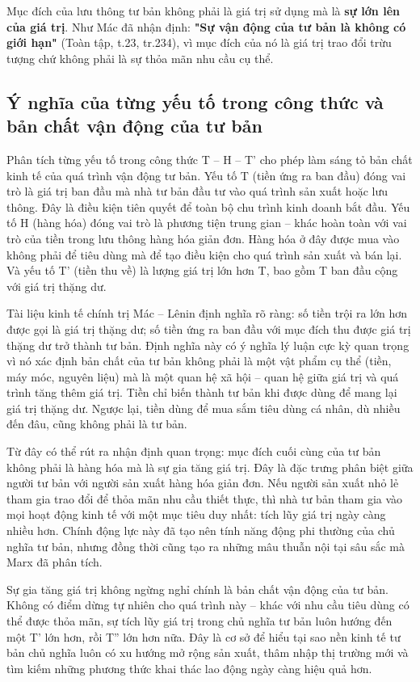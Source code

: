 Mục đích của lưu thông tư bản không phải là giá trị sử dụng mà là \textbf{sự lớn lên của giá trị}. Như Mác đã nhận định: \textbf{"Sự vận động của tư bản là không có giới hạn"} (Toàn tập, t.23, tr.234), vì mục đích của nó là giá trị trao đổi trừu tượng chứ không phải là sự thỏa mãn nhu cầu cụ thể.

\subsection{Ý nghĩa của từng yếu tố trong công thức và bản chất vận động của tư bản}
Phân tích từng yếu tố trong công thức T – H – T' cho phép làm sáng tỏ bản chất kinh tế của quá trình vận động tư bản. Yếu tố T (tiền ứng ra ban đầu) đóng vai trò là giá trị ban đầu mà nhà tư bản đầu tư vào quá trình sản xuất hoặc lưu thông. Đây là điều kiện tiên quyết để toàn bộ chu trình kinh doanh bắt đầu. Yếu tố H (hàng hóa) đóng vai trò là phương tiện trung gian – khác hoàn toàn với vai trò của tiền trong lưu thông hàng hóa giản đơn. Hàng hóa ở đây được mua vào không phải để tiêu dùng mà để tạo điều kiện cho quá trình sản xuất và bán lại. Và yếu tố T' (tiền thu về) là lượng giá trị lớn hơn T, bao gồm T ban đầu cộng với giá trị thặng dư.

Tài liệu kinh tế chính trị Mác – Lênin định nghĩa rõ ràng: số tiền trội ra lớn hơn được gọi là giá trị thặng dư; số tiền ứng ra ban đầu với mục đích thu được giá trị thặng dư trở thành tư bản. Định nghĩa này có ý nghĩa lý luận cực kỳ quan trọng vì nó xác định bản chất của tư bản không phải là một vật phẩm cụ thể (tiền, máy móc, nguyên liệu) mà là một quan hệ xã hội – quan hệ giữa giá trị và quá trình tăng thêm giá trị. Tiền chỉ biến thành tư bản khi được dùng để mang lại giá trị thặng dư. Ngược lại, tiền dùng để mua sắm tiêu dùng cá nhân, dù nhiều đến đâu, cũng không phải là tư bản.

Từ đây có thể rút ra nhận định quan trọng: mục đích cuối cùng của tư bản không phải là hàng hóa mà là sự gia tăng giá trị. Đây là đặc trưng phân biệt giữa người tư bản với người sản xuất hàng hóa giản đơn. Nếu người sản xuất nhỏ lẻ tham gia trao đổi để thỏa mãn nhu cầu thiết thực, thì nhà tư bản tham gia vào mọi hoạt động kinh tế với một mục tiêu duy nhất: tích lũy giá trị ngày càng nhiều hơn. Chính động lực này đã tạo nên tính năng động phi thường của chủ nghĩa tư bản, nhưng đồng thời cũng tạo ra những mâu thuẫn nội tại sâu sắc mà Marx đã phân tích.

Sự gia tăng giá trị không ngừng nghỉ chính là bản chất vận động của tư bản. Không có điểm dừng tự nhiên cho quá trình này – khác với nhu cầu tiêu dùng có thể được thỏa mãn, sự tích lũy giá trị trong chủ nghĩa tư bản luôn hướng đến một T' lớn hơn, rồi T'' lớn hơn nữa. Đây là cơ sở để hiểu tại sao nền kinh tế tư bản chủ nghĩa luôn có xu hướng mở rộng sản xuất, thâm nhập thị trường mới và tìm kiếm những phương thức khai thác lao động ngày càng hiệu quả hơn.

